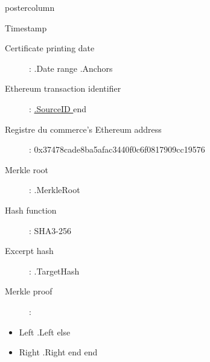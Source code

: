 \documentclass[roundedcorners=true, titleposition=center]{beamerthemeruhuisstijlposter}
\begin{document}
\begin{frame}
\begin{columns}
\begin{column}{0.95\textwidth}
\begin{beamercolorbox}[center, wd=\textwidth]{postercolumn}
\begin{minipage}[T]{0.95\textwidth}
    \hfill
\parbox[t][\columnheight]{\textwidth}{%

\begin{block}{Timestamp}
\begin{description}
    \item [Certificate printing date] :\linebreak
{{ .Date }}
{{ range .Anchors }}
\item [Ethereum transaction identifier] :\linebreak
\href{https://etherscan.io/tx/0x{{ .SourceID }} }{ {{.SourceID }} }
{{ end }}
\item[Registre du commerce's Ethereum address] :\linebreak
0x37478cade8ba5afac3440f0c6f0817909cc19576
\item[Merkle root] :\linebreak
{{ .MerkleRoot }}
\item[Hash function] : \linebreak
SHA3-256
\item[Excerpt hash] :\linebreak
{{ .TargetHash }}
\item[Merkle proof] :
\end{description}
\begin{itemize}
{{ range .Proof }}
    {{ if .Left }}
        \item Left {{ .Left }}
    {{ else }}
        \item Right {{ .Right }}
    {{ end }}
{{ end }}
\end{itemize}
\end{block}
}
\end{minipage}
\end{beamercolorbox}
\end{column}
\end{columns}
\end{frame}
\end{document}
